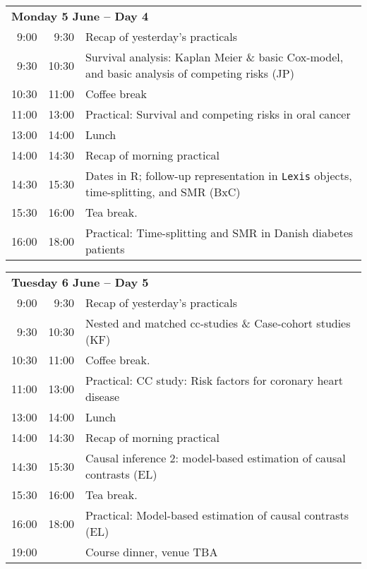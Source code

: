 \noindent
\begin{tabular}{r@{ -- }rp{13cm}}
\multicolumn{3}{l}{\bf Monday 5 June -- Day 4} \\
 9:00 &  9:30 & Recap of yesterday's practicals \\
 9:30 & 10:30 & Survival analysis: Kaplan Meier \& basic
                Cox-model, and basic analysis of competing risks (JP)\\ %
10:30 & 11:00 & Coffee break\\
11:00 & 13:00 & Practical: Survival and competing risks in oral cancer\\ %
13:00 & 14:00 & Lunch \\
14:00 & 14:30 & Recap of morning practical \\
14:30 & 15:30 & Dates in R; follow-up representation in \texttt{Lexis} objects,
                time-splitting,  and SMR (BxC)\\
15:30 & 16:00 & Tea break. \\
16:00 & 18:00 & Practical: Time-splitting and SMR in Danish diabetes
                patients\\[1em] %
\end{tabular}

\noindent
\begin{tabular}{r@{ -- }rp{13cm}}
\multicolumn{3}{l}{\bf Tuesday 6 June -- Day 5} \\
 9:00 &  9:30 & Recap of yesterday's practicals \\
 9:30 & 10:30 & Nested and matched cc-studies \& Case-cohort studies (KF)\\
10:30 & 11:00 & Coffee break. \\
11:00 & 13:00 & Practical: CC study: Risk factors for coronary heart
                disease\\ %
13:00 & 14:00 & Lunch \\
14:00 & 14:30 & Recap of morning practical \\
14:30 & 15:30 & Causal inference 2: model-based estimation of causal
                contrasts (EL)\\ %
15:30 & 16:00 & Tea break. \\
16:00 & 18:00 & Practical: Model-based estimation of causal
                contrasts (EL)\\ %
19:00 &       & Course dinner, venue TBA\\[1em]
\end{tabular}

